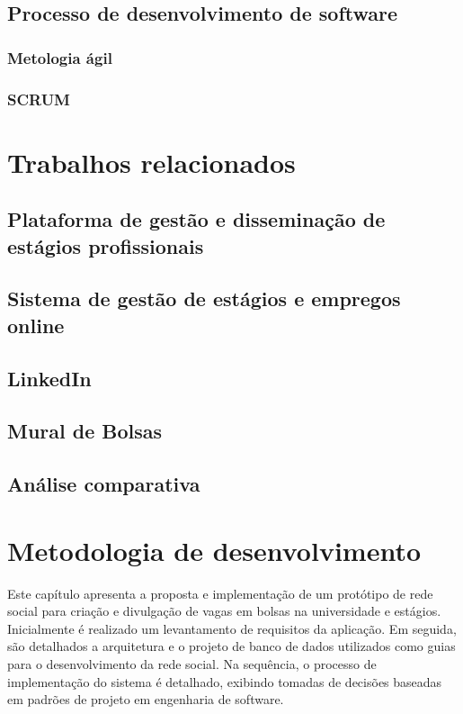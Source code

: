 \documentclass[cic,tc]{iiufrgs}
\begin{document}
\section{Processo de desenvolvimento de software}

\subsection{Metologia ágil}
\label{fundSWAgil}
\subsection{SCRUM}
\label{fundSWSCRUM}



\chapter{Trabalhos relacionados}

\section{Plataforma de gestão e disseminação de estágios profissionais}
\label{trabRelPlatGestao}

\section{Sistema de gestão de estágios e empregos online}
\label{trabRelSistEmprego}

\section{LinkedIn}
\label{trabRelLinkedin}

\section{Mural de Bolsas}
\label{trabRelMDB}

\section{Análise comparativa}
\label{trabRelAnalise}

\chapter{Metodologia de desenvolvimento}
\label{metodologiaDesenvolvimento}
Este capítulo apresenta a proposta e implementação de um protótipo de rede social para criação e divulgação de vagas em bolsas na universidade e estágios. Inicialmente é realizado um levantamento de requisitos da aplicação. Em seguida, são detalhados a arquitetura e o projeto de banco de dados utilizados como guias para o desenvolvimento da rede social. Na sequência, o processo de implementação do sistema é detalhado, exibindo tomadas de decisões baseadas em padrões de projeto em engenharia de software.
\end{document}
